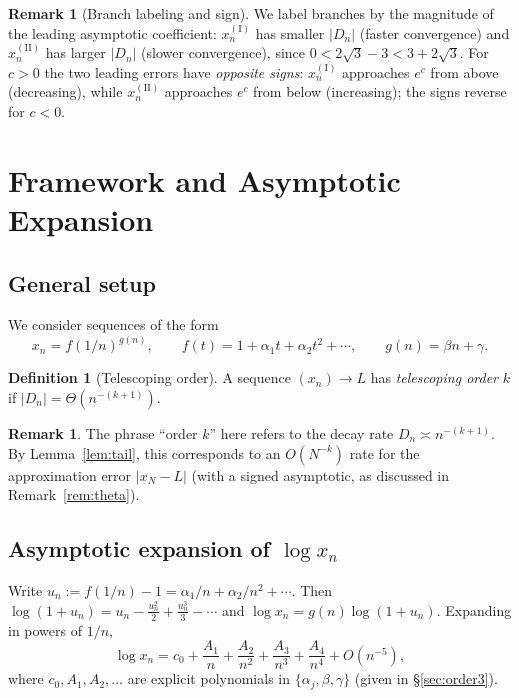 \documentclass[11pt]{article}
\theoremstyle{definition}
\newtheorem{definition}[theorem]{Definition}
\newtheorem{remark}[theorem]{Remark}
\begin{document}
\begin{remark}[Branch labeling and sign]\label{rem:branch}
We label branches by the magnitude of the leading asymptotic coefficient:
$x_n^{(\mathrm{I})}$ has smaller $|D_n|$ (faster convergence) and
$x_n^{(\mathrm{II})}$ has larger $|D_n|$ (slower convergence), since
$0<2\sqrt3-3<3+2\sqrt3$. For $c>0$ the two leading errors have \emph{opposite
signs}: $x_n^{(\mathrm{I})}$ approaches $e^{c}$ from above (decreasing), while
$x_n^{(\mathrm{II})}$ approaches $e^{c}$ from below (increasing); the signs
reverse for $c<0$.
\end{remark}

\section{Framework and Asymptotic Expansion}

\subsection{General setup}
We consider sequences of the form
\[
  x_n = f(1/n)^{g(n)}, \qquad
  f(t) = 1 + \alpha_1 t + \alpha_2 t^2 + \cdots, \qquad
  g(n) = \beta n + \gamma .
\]

\begin{definition}[Telescoping order]\label{def:order}
A sequence $(x_n)\to L$ has \emph{telescoping order} $k$ if
$|D_n| = \Theta(n^{-(k+1)})$.
\end{definition}

\begin{remark}\label{rem:order}
The phrase ``order $k$'' here refers to the decay rate
$D_n\asymp n^{-(k+1)}$. By Lemma~\ref{lem:tail}, this corresponds to an
$O(N^{-k})$ rate for the approximation error $|x_N-L|$ (with a signed
asymptotic, as discussed in Remark~\ref{rem:theta}).
\end{remark}

\subsection{Asymptotic expansion of $\log x_n$}
Write $u_n := f(1/n)-1 = \alpha_1/n + \alpha_2/n^2 + \cdots$. Then
$\log(1+u_n) = u_n - \tfrac{u_n^2}{2} + \tfrac{u_n^3}{3} - \cdots$ and
$\log x_n = g(n)\log(1+u_n)$. Expanding in powers of $1/n$,
\begin{equation}\label{eq:logexp}
  \log x_n = c_0 + \frac{A_1}{n} + \frac{A_2}{n^2} + \frac{A_3}{n^3} + \frac{A_4}{n^4} + O(n^{-5}),
\end{equation}
where $c_0,A_1,A_2,\dots$ are explicit polynomials in $\{\alpha_j,\beta,\gamma\}$
(given in \S\ref{sec:order3}).
\end{document}
